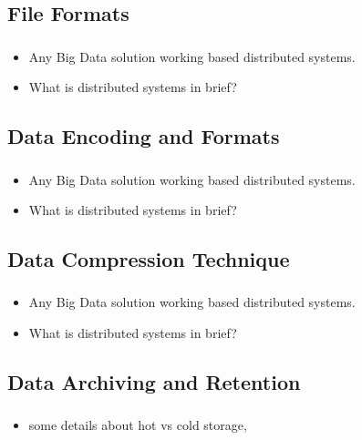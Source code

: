 \subsection{File Formats}

\begin{frame}
\frametitle{\subsecname}
\begin{itemize}[<+->]
	\item Any Big Data solution working based distributed systems.
	\item What is distributed systems in brief?
\end{itemize}
\end{frame}
\subsection{Data Encoding and Formats}

\begin{frame}
\frametitle{\subsecname}
\begin{itemize}[<+->]
	\item Any Big Data solution working based distributed systems.
	\item What is distributed systems in brief?
\end{itemize}
\end{frame}
\subsection{Data Compression Technique}

\begin{frame}
\frametitle{\subsecname}
\begin{itemize}[<+->]
\item Any Big Data solution working based distributed systems.
\item What is distributed systems in brief?
\end{itemize}
\end{frame}

\subsection{Data Archiving and Retention}
\begin{frame}
\frametitle{\subsecname}
\begin{itemize}[<+->]
	\item some details about hot vs cold storage,
\end{itemize}
\end{frame}

